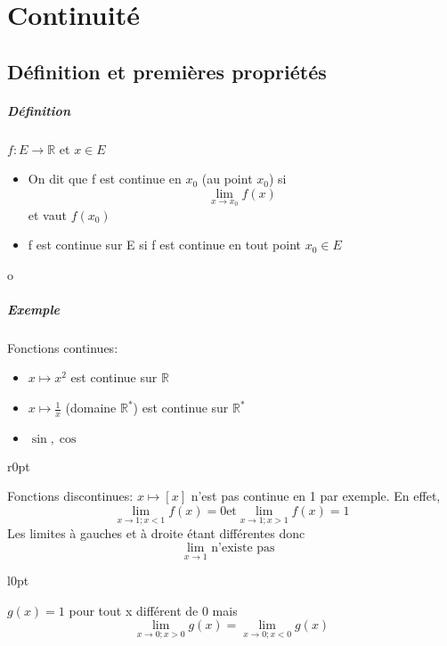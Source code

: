 \chapter{Continuité}
\section{Définition et premières propriétés}

\paragraph{Définition} $f:E \rightarrow \mathbb{R}$ et $x \in E$ \\
\begin{itemize}
	\item On dit que f est continue en $x_0$ (au point $x_0$) si \[\lim_{x\to x_0} f(x)\] et vaut $f(x_0)$
	\item f est continue sur E si f est continue en tout point $x_0 \in E$
\end{itemize}
o
\paragraph{Exemple} 
Fonctions continues:
\begin{itemize}
	\item $x \mapsto x^2$ est continue sur $\mathbb{R}$
	\item $x \mapsto \frac{1}{x}$ (domaine $\mathbb{R}^*$) est continue sur $\mathbb{R}^*$
	\item $\sin, \cos$
\end{itemize}

\begin{wrapfigure}{r}{0pt}
\end{wrapfigure}
Fonctions discontinues:
$x \mapsto [x]$ n'est pas continue en 1 par exemple. En effet, \[\lim_{x\to 1; x<1} f(x) = 0 \text{et} \lim_{x\to 1; x>1} f(x) = 1\] Les limites à gauches et à droite étant différentes donc \[\lim_{x\to 1} \text{ n'existe pas }\]


\begin{wrapfigure}{l}{0pt}
\end{wrapfigure}
$g(x) = 1$ pour tout x différent de 0
mais \[\lim_{x\to 0; x > 0} g(x) = \lim_{x \to 0; x <0} g(x) \]

